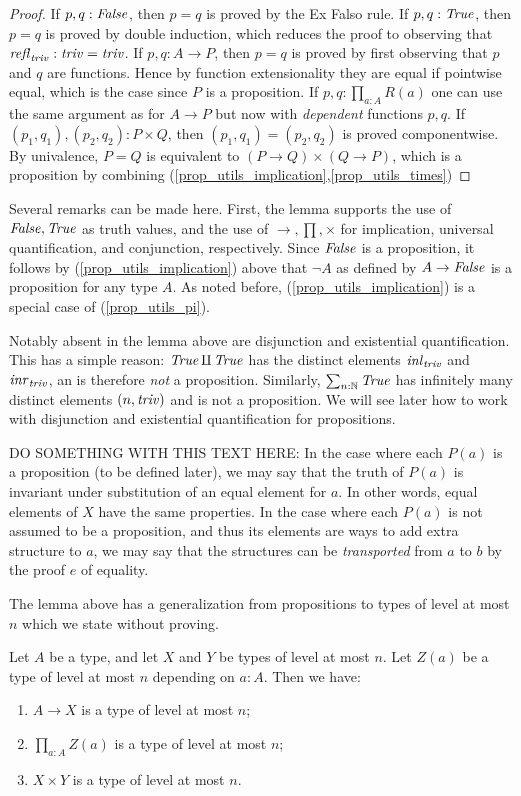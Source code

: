 \begin{proof}
If $p,q : \mathop{\mathit{False}}$, then $p=q$ is proved by the Ex Falso rule.
If $p,q : \mathop{\mathit{True}}$, then $p=q$ is proved by double induction,
which reduces the proof to observing that $\mathop{{\it refl}_{\mathop{\mathit{triv}}}}: \mathop{\mathit{triv}}=\mathop{\mathit{triv}}$.
If $p,q : A\to P$, then $p=q$ is proved by first observing that $p$ and $q$
are functions. Hence by function extensionality they are equal if pointwise
equal, which is the case since $P$ is a proposition.
If $p,q : \prod_{a:A} R(a)$ one can use the same argument as for $A\to P$
but now with \emph{dependent} functions $p,q$.
If $(p_1,q_1),(p_2,q_2) : P\times Q$, then $(p_1,q_1)=(p_2,q_2)$
is proved componentwise. By univalence, $P = Q$ is equivalent to
$(P\to Q)\times(Q\to P)$, which is a proposition by 
combining (\ref{prop_utils_implication},\ref{prop_utils_times})
\end{proof}

Several remarks can be made here. First, the lemma supports the
use of $\mathop{\mathit{False}},\mathop{\mathit{True}}$ as truth values, and the use of 
$\to,\prod,\times$ for implication, universal quantification,
and conjunction, respectively. Since $\mathop{\mathit{False}}$ is a proposition,
it follows by (\ref{prop_utils_implication}) above that 
$\neg A$ as defined by $A\to\mathop{\mathit{False}}$ is a proposition for any type $A$.
As noted before, (\ref{prop_utils_implication}) is a
special case of (\ref{prop_utils_pi}).

Notably absent in the lemma above are disjunction
and existential quantification. This has a simple reason:
$\mathop{\mathit{True}}\amalg \mathop{\mathit{True}}$ has the distinct elements 
$\mathop{{\it inl}_{\mathop{\mathit{triv}}}}$ and $\mathop{{\it inr}_{\mathop{\mathit{triv}}}}$, an is therefore \emph{not} a proposition. 
Similarly, $\sum_{n:\mathbb{N}} \mathop{\mathit{True}}$ has infinitely many 
distinct elements $(n,\mathop{\mathit{triv}})$ and is not a proposition. We will see later how
to work with disjunction and existential quantification for propositions.

DO SOMETHING WITH THIS TEXT HERE: In the case where each $P(a)$ is a proposition (to be defined later), we may say that the truth of $P(a)$ is
invariant under substitution of an equal element for $a$.  In other words, equal elements of $X$ have the same properties.  In the case where each $P(a)$ is not assumed to
be a proposition, and thus its elements are ways to add extra structure to $a$, we may say that the structures can be {\em transported} from $a$
to $b$ by the proof $e$ of equality.

The lemma above has a generalization from propositions to
types of level at most $n$ which we state without proving.

\begin{lemma}\label{lem:level_n_utils}
Let $A$ be a type, and let $X$ and $Y$ be types of level at most $n$.
Let $Z(a)$ be a type of level at most $n$ depending on $a:A$. Then we have:
\begin{enumerate}
\item\label{level_n_utils_implication} $A\to X$ is a type of level at most $n$;
\item\label{level_n_utils_pi} $\prod_{a:A} Z(a)$ is a type of level at most $n$;
\item\label{level_n_utils_times} $X\times Y$ is a type of level at most $n$.
\end{enumerate}
\end{lemma}

